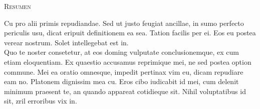\blankpage
\pagebreak

\textsc{\Large Resumen}

Cu pro alii primis repudiandae. Sed ut justo feugiat ancillae, in sumo perfecto periculis usu, dicat eripuit definitionem ea sea. Tation facilis per ei. Eos eu postea verear nostrum. Solet intellegebat est in.\\[.2em]

Quo te noster consetetur, at eos doming vulputate conclusionemque, ex cum etiam eloquentiam. Ex quaestio accusamus reprimique mei, ne sed postea option commune. Mei ea oratio omnesque, impedit pertinax vim eu, dicam repudiare eam no. Platonem dignissim mea cu. Eros cibo iudicabit id mei, cum delenit minimum praesent te, an quando appareat cotidieque sit. Nihil voluptatibus id sit, zril erroribus vix in.


 
\tableofcontents